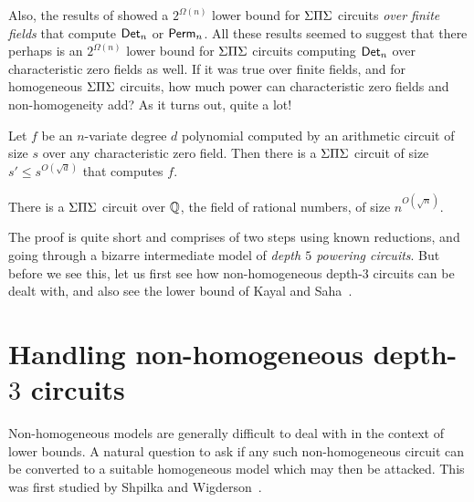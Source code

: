 Also, the results of \cite{gr00,grigoriev98} showed a $2^{\Omega(n)}$
lower bound for $\Sigma\Pi\Sigma$ circuits \emph{over finite fields} that compute
$\mathsf{Det}_n$ or $\mathsf{Perm}_n$.
All these results seemed to suggest that there perhaps is an
$2^{\Omega(n)}$ lower bound for $\Sigma\Pi\Sigma$ circuits computing $\mathsf{Det}_n$
over characteristic zero fields as well.
If it was true over finite fields, and for homogeneous $\Sigma\Pi\Sigma$
circuits, how much power can characteristic zero fields and
non-homogeneity add? As it turns out, quite a lot!

\begin{theorem} \label{thm:chasm-at-3} Let $f$ be an
  $n$-variate degree $d$ polynomial computed by an arithmetic circuit
  of size $s$ over any characteristic zero field.
  Then there is a $\Sigma\Pi\Sigma$ circuit of size $s' \leq s^{O(\sqrt{d})}$
  that computes $f$. 
\end{theorem}
\begin{corollary}\label{cor:det-sps}
There is a $\Sigma\Pi\Sigma$ circuit over $\mathbb{Q}$, the field of rational numbers, of size $n^{O(\sqrt{n})}$. 
\end{corollary}


The proof is quite short and comprises of two steps using known
reductions, and going through a bizarre intermediate model of
\emph{depth $5$ powering circuits}.
But before we see this, let us first see how non-homogeneous depth-$3$
circuits can be dealt with, and also see the lower bound of Kayal and
Saha~\cite{KayalSaha14}. 


\section{Handling non-homogeneous depth-$3$ circuits}\label{sec:non-hom-d3}

Non-homogeneous models are generally difficult to deal with in the
context of lower bounds.
A natural question to ask if any such non-homogeneous circuit can be
converted to a suitable homogeneous model which may then be attacked.
This was first studied by Shpilka and Wigderson~\cite{sw2001}. \\

